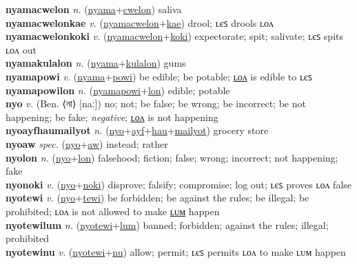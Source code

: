 \textbf{nyamacwelon} \textit{n.} (\hyperref[nyama]{nyama}+\hyperref[cwelon]{cwelon})
saliva \label{nyamacwelon} \\
\textbf{nyamacwelonkae} \textit{v.} (\hyperref[nyamacwelon]{nyamacwelon}+\hyperref[kae]{kae})
drool; ʟєꜱ drools ʟᴏᴧ \label{nyamacwelonkae} \\
\textbf{nyamacwelonkoki} \textit{v.} (\hyperref[nyamacwelon]{nyamacwelon}+\hyperref[koki]{koki})
expectorate; spit; salivate; ʟєꜱ spits ʟᴏᴧ out \label{nyamacwelonkoki} \\
\textbf{nyamakulalon} \textit{n.} (\hyperref[nyama]{nyama}+\hyperref[kulalon]{kulalon})
gums \label{nyamakulalon} \\
\textbf{nyamapowi} \textit{v.} (\hyperref[nyama]{nyama}+\hyperref[powi]{powi})
be edible; be potable; \hyperref[nyamapowilon]{ʟᴏᴧ} is edible to ʟєꜱ \label{nyamapowi} \\
\textbf{nyamapowilon} \textit{n.} (\hyperref[nyamapowi]{nyamapowi}+\hyperref[lon]{lon})
edible; potable \label{nyamapowilon} \\
\textbf{nyo} \textit{v.} (Ben. ⟨না⟩ [naː])
no; not; be false; be wrong; be incorrect; be not happening; be fake; \textit{negative}; \hyperref[nyolon]{ʟᴏᴧ} is not happening \label{nyo} \\
\textbf{nyoayfhaumailyot} \textit{n.} (\hyperref[nyo]{nyo}+\hyperref[ayf]{ayf}+\hyperref[hau]{hau}+\hyperref[mailyot]{mailyot})
grocery store \label{nyoayfhaumailyot} \\
\textbf{nyoaw} \textit{spec.} (\hyperref[nyo]{nyo}+\hyperref[aw]{aw})
instead; rather \label{nyoaw} \\
\textbf{nyolon} \textit{n.} (\hyperref[nyo]{nyo}+\hyperref[lon]{lon})
falsehood; fiction; false; wrong; incorrect; not happening; fake \label{nyolon} \\
\textbf{nyonoki} \textit{v.} (\hyperref[nyo]{nyo}+\hyperref[noki]{noki})
disprove; falsify; compromise; log out; ʟєꜱ proves ʟᴏᴧ false \label{nyonoki} \\
\textbf{nyotewi} \textit{v.} (\hyperref[nyo]{nyo}+\hyperref[tewi]{tewi})
be forbidden; be against the rules; be illegal; be prohibited; ʟᴏᴧ is not allowed to make \hyperref[nyotewilum]{ʟᴜᴍ} happen \label{nyotewi} \\
\textbf{nyotewilum} \textit{n.} (\hyperref[nyotewi]{nyotewi}+\hyperref[lum]{lum})
banned; forbidden; against the rules; illegal; prohibited \label{nyotewilum} \\
\textbf{nyotewinu} \textit{v.} (\hyperref[nyotewi]{nyotewi}+\hyperref[nu]{nu})
allow; permit; ʟєꜱ permits ʟᴏᴧ to make ʟᴜᴍ happen \label{nyotewinu} \\
